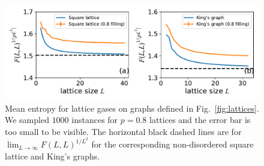 \documentclass[onefignum, onetabnum]{siamart190516}
\newcommand{\<}{\langle}
\renewcommand{\>}{\rangle}
\newcommand{\Fig}[1]{Fig.~\ref{#1}}
\begin{document}
\begin{figure}[t] 
    \centering
    \includegraphics[width=\textwidth, trim={0cm 0cm 0cm 0cm}, clip]{figures/fig5.pdf}
    \caption{Mean entropy for lattice gases on graphs defined in \Fig{fig:lattices}.
    We sampled $1000$ instances for $p=0.8$ lattices and the error bar is too small to be visible.
    The horizontal black dashed lines are for $\lim_{L\rightarrow \infty} F(L,L)^{1/L^2}$ for the corresponding non-disordered square lattice and King's graphs.
    }
    \label{fig:hardsquare}
\end{figure}
\end{document}
